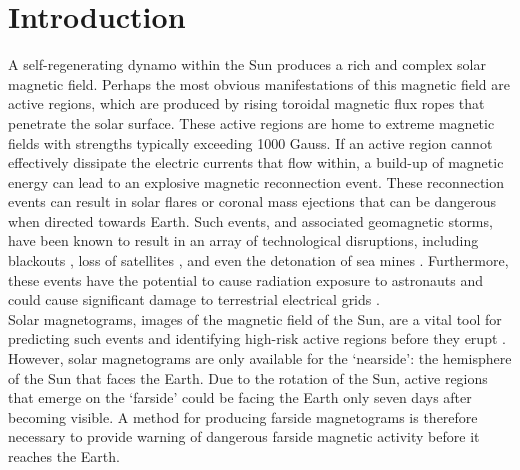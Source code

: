 \documentclass[11pt,a4paper,onecolumn]{report}
\begin{document}





\tableofcontents









%
%
%
%
\chapter{Introduction}
%
%
%
%

A self-regenerating dynamo within the Sun produces a rich and complex solar
magnetic field. Perhaps the most obvious manifestations of this magnetic field
are active regions, which are produced by rising toroidal magnetic flux ropes
that penetrate the solar surface. These active regions are home to extreme
magnetic fields with strengths typically exceeding 1000 Gauss. If an active
region cannot effectively dissipate the electric currents that flow within, a build-up
of magnetic energy can lead to an explosive magnetic reconnection event. These
reconnection events can result in solar flares or coronal mass ejections that
can be dangerous when directed towards Earth. Such events, and associated
geomagnetic storms, have been known to result in an array of technological
disruptions, including blackouts \citep{odenwald_day_2015}, loss of satellites
\citep{carlowicz_did_1997}, and even the detonation of sea mines
\citep{knipp_little-known_2018}. Furthermore, these events have the potential to
cause radiation exposure to astronauts \citep{hu_modeling_2009} and could cause
significant damage to terrestrial electrical grids
\citep{council_severe_2008}. \\


Solar magnetograms, images of the magnetic field of the Sun, are a vital tool
for predicting such events and identifying high-risk active regions before they
erupt
\citep{song_statistical_2009,yuan_solar_2010,lan_automated_2012,bobra_solar_2015,
chen_identifying_2019}. However, solar magnetograms are only available for the
`nearside': the hemisphere of the Sun that faces the Earth. Due to the rotation
of the Sun, active regions that emerge on the `farside' could be facing the
Earth only seven days after becoming visible. A method for producing farside
magnetograms is therefore necessary to provide warning of dangerous farside
magnetic activity before it reaches the Earth. \\
\end{document}
